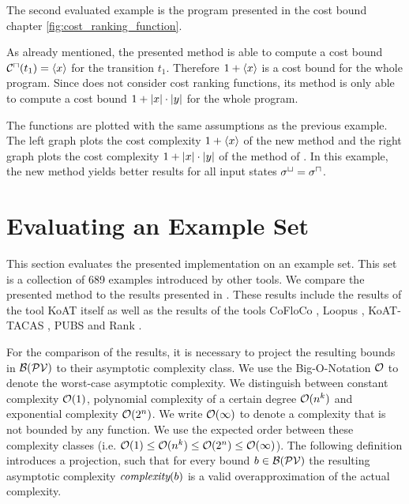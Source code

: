 The second evaluated example is the program presented in the cost bound chapter \ref{fig:cost_ranking_function}.



As already mentioned, the presented method is able to compute a cost bound ${\mathcal{C}^\sqcap}(t_1) = \left\langle x \right\rangle$ for the transition $t_1$.
Therefore $1 + \left\langle x \right\rangle$ is a cost bound for the whole program.
Since \cite{koat} does not consider cost ranking functions, its method is only able to compute a cost bound $1 + \left|x\right| \cdot \left|y\right|$ for the whole program.

The functions are plotted with the same assumptions as the previous example.
The left graph plots the cost complexity $1 + \left\langle x \right\rangle$ of the new method and the right graph plots the cost complexity $1 + \left|x\right| \cdot \left|y\right|$ of the method of \cite{koat}.
In this example, the new method yields better results for all input states ${\sigma^\sqcup} = {\sigma^\sqcap}$.

\section{Evaluating an Example Set}

This section evaluates the presented implementation on an example set.
This set is a collection of 689 examples introduced by other tools.
We compare the presented method to the results presented in \cite{koat}.
These results include the results of the tool KoAT itself as well as the results of the tools CoFloCo \cite{cofloco1, cofloco2}, Loopus \cite{loopus1, loopus2}, KoAT-TACAS \cite{leike2014ranking}, PUBS \cite{pubs1, pubs2} and Rank \cite{rank}.

For the comparison of the results, it is necessary to project the resulting bounds in $\mathcal{B}(\mathcal{PV})$ to their asymptotic complexity class.
We use the Big-O-Notation $\mathcal{O}$ \cite{bigo} to denote the worst-case asymptotic complexity.
We distinguish between constant complexity $\mathcal{O}(1)$, polynomial complexity of a certain degree $\mathcal{O}(n^k)$ and exponential complexity $\mathcal{O}(2^n)$.
We write $\mathcal{O}(\infty)$ to denote a complexity that is not bounded by any function.
We use the expected order between these complexity classes (i.e. $\mathcal{O}(1) \leq \mathcal{O}(n^k) \leq \mathcal{O}(2^n) \leq \mathcal{O}(\infty)$).
The following definition introduces a projection, such that for every bound $b \in \mathcal{B}(\mathcal{PV})$ the resulting asymptotic complexity $\emph{complexity}(b)$ is a valid overapproximation of the actual complexity.

